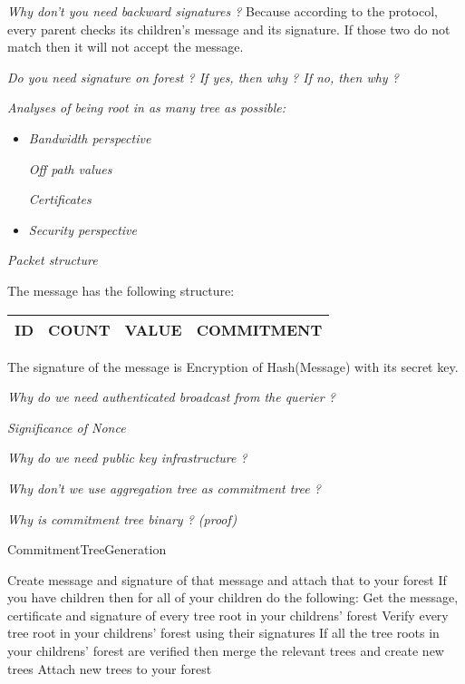 \textit{Why don't you need backward signatures ?} Because according to the protocol, every parent checks its children's message and its signature. If those two do not match then it will not accept the message.

\textit{Do you need signature on forest ? If yes, then why ? If no, then why ?}

\textit{Analyses of being root in as many tree as possible:}
	
	\begin{itemize}
		\item \textit{Bandwidth perspective}
	
			\textit{Off path values}
	
			\textit{Certificates}

		\item \textit{Security perspective}
	\end{itemize}

\textit{Packet structure}

	The message has the following structure:

	\begin{tabular}{ | l | l | l | l |}
		\hline
		ID & COUNT & VALUE & COMMITMENT\\
		\hline
	\end{tabular}

	The signature of the message is Encryption of Hash(Message) with its secret key.
	
\textit{Why do we need authenticated broadcast from the querier ?}

\textit{Significance of Nonce}

\textit{Why do we need public key infrastructure ?}

\textit{Why don't we use aggregation tree as commitment tree ?}

\textit{Why is commitment tree binary ? (proof)}

\begin{algorithm}[H]
\caption {CommitmentTreeGeneration}\label{number3}
	\begin {algorithmic}[1]
			\STATE Create message and signature of that message and attach that to your forest
			\STATE If you have children then for all of your children do the following:
			\STATE Get the message, certificate and signature of every tree root in your childrens' forest
			\STATE Verify every tree root in your childrens' forest using their signatures 
			\STATE If all the tree roots in your childrens' forest are verified then merge the relevant trees and create new trees
			\STATE Attach new trees to your forest
		\ENDFOR
	\end{algorithmic}
\end{algorithm}

